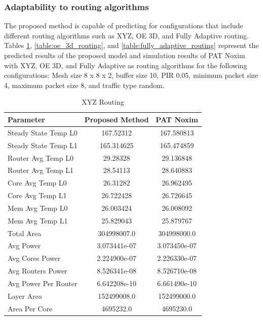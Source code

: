 \documentclass[conference]{IEEEtran}
\begin{document}
	\subsubsection{Adaptability to routing algorithms}
	The proposed method is capable of predicting for configurations that include different routing algorithms such as XYZ, OE 3D, and Fully Adaptive routing. Tables \ref{table:xyz_routing}, \ref{table:oe_3d_routing}, and \ref{table:fully_adaptive_routing} represent the predicted results of the proposed model and simulation results of PAT Noxim with XYZ, OE 3D, and Fully Adaptive as routing algorithms for the following configurations: Mesh size 8 x 8 x 2, buffer size 10, PIR 0.05, minimum packet size 4, maximum packet size 8, and traffic type random.
	
	\begin{table}[h!]
		\centering
		\begin{tabular}{|l|c|c|}
			\hline
			\textbf{Parameter} & \textbf{Proposed Method} & \textbf{PAT Noxim} \\ \hline
			Steady State Temp L0 & 167.52312 & 167.580813 \\ \hline
			Steady State Temp L1 & 165.314625 & 165.474859 \\ \hline
			Router Avg Temp L0 & 29.28328 & 29.136848 \\ \hline
			Router Avg Temp L1 & 28.54113 & 28.640883 \\ \hline
			Core Avg Temp L0 & 26.31282 & 26.962495 \\ \hline
			Core Avg Temp L1 & 26.722428 & 26.726645 \\ \hline
			Mem Avg Temp L0 & 26.003424 & 26.008092 \\ \hline
			Mem Avg Temp L1 & 25.829043 & 25.879767 \\ \hline
			Total Area & 304998007.0 & 304998000.0 \\ \hline
			Avg Power & 3.073441e-07 & 3.073450e-07 \\ \hline
			Avg Cores Power & 2.224900e-07 & 2.226330e-07 \\ \hline
			Avg Routers Power & 8.526341e-08 & 8.526710e-08 \\ \hline
			Avg Power Per Router & 6.642208e-10 & 6.661490e-10 \\ \hline
			Layer Area & 152499008.0 & 152499000.0 \\ \hline
			Area Per Core & 4695232.0 & 4695230.0 \\ \hline
		\end{tabular}
		\caption{XYZ Routing}
		\label{table:xyz_routing}
	\end{table}
	
\end{document}
